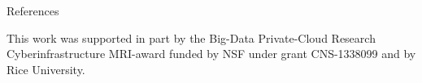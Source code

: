 \documentclass[final]{beamer}
\begin{document}
\begin{frame}
\begin{columns}[T]
\begin{column}{0.49\linewidth}
\begin{block}{References}
      \scriptsize
      \vspace{-2ex}
      \begin{multicols}{2}
        
        
      \end{multicols}
      This work was supported in part by the Big-Data Private-Cloud Research Cyberinfrastructure MRI-award funded by NSF under grant CNS-1338099 and by Rice University.
    \end{block}
  \end{column}
  \end{columns}
\end{frame}
\end{document}
